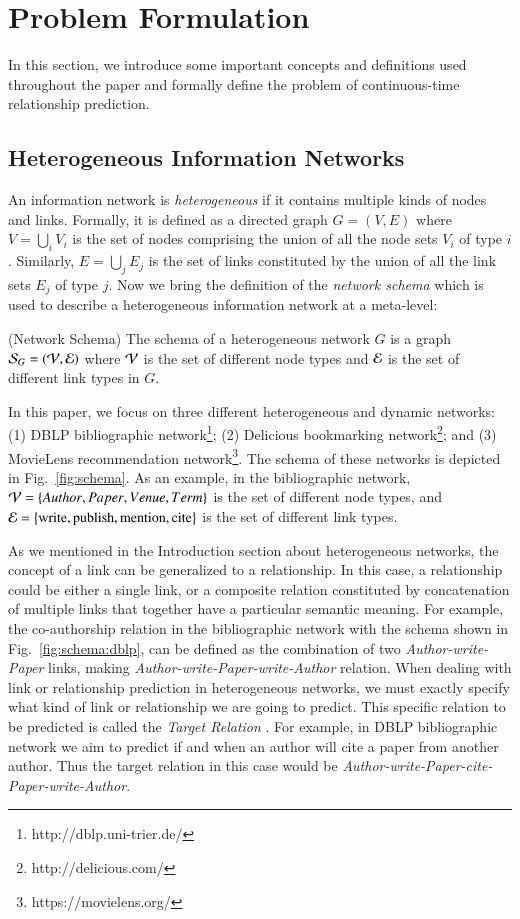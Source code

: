 \section{Problem Formulation}\label{sec:problem}
In this section, we introduce some important concepts and definitions used throughout the paper and formally define the problem of continuous-time relationship prediction.

\subsection{Heterogeneous Information Networks}

An information network is \emph{heterogeneous} if it contains multiple kinds of nodes and links. Formally, it is defined as a directed graph $G=(V,E)$ where $V = \bigcup_i V_i$ is the set of nodes comprising the union of all the node sets $V_i$ of type $i$. Similarly, $E=\bigcup_j E_j$ is the set of links constituted by the union of all the link sets $E_j$ of type $j$. Now we bring the definition of the \emph{network schema} \cite{sun2011pathsim} which is used to describe a heterogeneous information network at a meta-level:

\begin{definition}{(Network Schema)}
	The schema of a heterogeneous network $G$ is a graph $\mathcal{S}_G=(\mathcal{V}, \mathcal{E})$ where $\mathcal{V}$ is the set of different node types and $\mathcal{E}$ is the set of different link types in $G$.
\end{definition}

In this paper, we focus on three different heterogeneous and dynamic networks: (1) DBLP bibliographic network\footnote{http://dblp.uni-trier.de/}; (2) Delicious bookmarking network\footnote{http://delicious.com/}; and (3) MovieLens recommendation network\footnote{https://movielens.org/}. The schema of these networks is depicted in Fig.~\ref{fig:schema}. As an example, in the bibliographic network, $\mathcal{V}=\left\lbrace {Author}, {Paper}, {Venue}, {Term}\right\rbrace$ is the set of different node types, and $\mathcal{E}=\left\lbrace\text{write}, \text{publish}, \text{mention}, \text{cite}\right\rbrace$ is the set of different link types.

As we mentioned in the Introduction section about heterogeneous networks, the concept of a link can be generalized to a relationship. In this case, a relationship could be either a single link, or a composite relation constituted by concatenation of multiple links that together have a particular semantic meaning. For example, the co-authorship relation in the bibliographic network with the schema shown in Fig.~\ref{fig:schema:dblp}, can be defined as the combination of two \emph{Author-{write}-Paper} links, making \emph{Author-{write}-Paper-{write}-Author} relation. When dealing with link or relationship prediction in heterogeneous networks, we must exactly specify what kind of link or relationship we are going to predict. This specific relation to be predicted is called the \emph{Target Relation} \cite{sun2012will}. For example, in DBLP bibliographic network we aim to predict if and when an author will cite a paper from another author. Thus the target relation in this case would be \emph{Author-{write}-Paper-{cite}-Paper-{write}-Author}.

